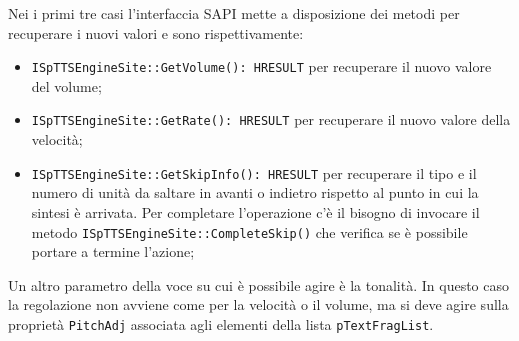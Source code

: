 	Nei i primi tre casi l'interfaccia SAPI mette a disposizione dei metodi per recuperare i nuovi valori e sono rispettivamente:
	\begin{itemize}
		\item \texttt{ISpTTSEngineSite::GetVolume(): HRESULT} per recuperare il nuovo valore del volume;
		\item \texttt{ISpTTSEngineSite::GetRate(): HRESULT} per recuperare il nuovo valore della velocità;
		\item \texttt{ISpTTSEngineSite::GetSkipInfo(): HRESULT} per recuperare il tipo e il numero di unità da saltare in avanti o indietro rispetto al punto in cui la sintesi è arrivata. Per completare l'operazione c'è il bisogno di invocare il metodo \texttt{ISpTTSEngineSite::CompleteSkip()} che verifica se è possibile portare a termine l'azione;
	\end{itemize}	
	Un altro parametro della voce su cui è possibile agire è la tonalità. In questo caso la regolazione non avviene come per la velocità o il volume, ma si deve agire sulla proprietà \texttt{PitchAdj} associata agli elementi della lista \texttt{pTextFragList}.
	
